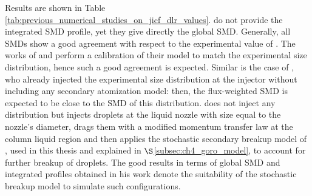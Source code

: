 Results are shown in Table \ref{tab:previous_numerical_studies_on_jicf_dlr_values}.   do not provide the integrated SMD profile, yet they give directly the global SMD. Generally, all SMDs show a good agreement with respect to the experimental value of . The works of  and  perform a calibration of their model to match the experimental size distribution, hence such a good agreement is expected. Similar is the case of , who already injected the experimental size distribution at the injector without including any secondary atomization model: then, the flux-weighted SMD is expected to be close to the SMD of this distribution.  does not inject any distribution but injects droplets at the liquid nozzle with size equal to the nozzle's diameter, drags them with a modified momentum transfer law at the column liquid region and then applies the stochastic secondary breakup model of , used in this thesis and explained in $\S$\ref{subsec:ch4_goro_model}, to account for further breakup of droplets. The good results in terms of global SMD and integrated profiles obtained in his work denote the suitability of the stochastic breakup model to simulate such configurations.





